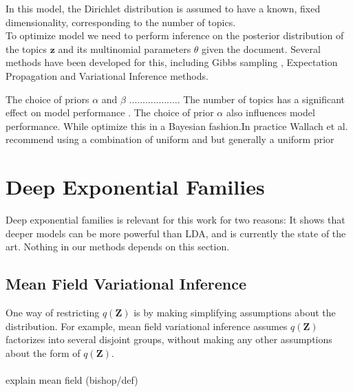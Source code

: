 \documentclass{report}
\begin{document}
In this model, the Dirichlet distribution is assumed to have a known, fixed dimensionality, corresponding to the number of topics.\\
To optimize model we need to perform inference on the posterior distribution of the topics $\mathbf{z}$ and its multinomial parameters $\theta$ given the document. Several methods have been developed for this, including Gibbs sampling \cite{griffiths2004finding}, Expectation Propagation \cite{minka2002expectation} and Variational Inference \cite{blei2003latent} methods. 



The choice of priors $\alpha$ and $\beta$ ...................
The number of topics has a significant effect on model performance \cite{blei2003latent}. The choice of prior $\alpha$ also influences model performance. While \cite{blei2003latent} optimize this in a Bayesian fashion.In practice Wallach et al.\cite{wallach2009rethinking} recommend using a combination of uniform and but generally a uniform prior 
		
\section{Deep Exponential Families}\label{DEF}

Deep exponential families is relevant for this work for two reasons: It shows that deeper models can be more powerful than LDA, and is currently the state of the art. Nothing in our methods depends on this section.


\subsection{Mean Field Variational Inference}\label{MFVI}
One way of restricting $q(\mathbf{Z})$ is by making simplifying assumptions about the distribution. For example, mean field variational inference \cite{bishop2006pattern} assumes $q(\mathbf{Z})$ factorizes into several disjoint groups, without making any other assumptions about the form of $q(\mathbf{Z})$. \\ \\
explain mean field (bishop/def)
\end{document}
